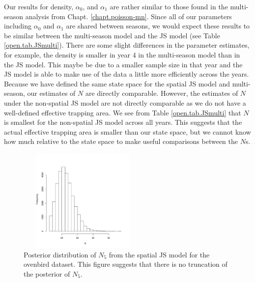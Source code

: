 Our results for density, $\alpha_0$, and $\alpha_1$ are rather similar to
those found in the multi-season analysis from
Chapt. \ref{chapt.poisson-mn}.  Since all of our parameters including
$\alpha_0$ and $\alpha_1$ are shared between seasons, we would expect these
results to be similar between the multi-season model and the JS model
(see Table \ref{open.tab.JSmulti}).  There are some slight differences
in the parameter estimates, for example, the density is smaller in
year 4 in the multi-season model than in the JS model.  This maybe be
due to a smaller sample size in that year and the JS model is able to
make use of the data a little more efficiently across the years.
Because we have defined the same state space for the spatial JS model
and multi-season, our estimates of $N$ are directly comparable.
However, the estimates of $N$ under the non-spatial JS model are not
directly comparable as we do not have a well-defined effective
trapping area.  We see from Table \ref{open.tab.JSmulti} that $N$ is
smallest for the non-spatial JS model across all years.  This suggests
that the actual effective trapping area is smaller than our state
space, but we cannot know how much relative to the state space to make
useful comparisons between the $N$s.


\begin{figure}
\centering
\includegraphics[height=2in,width=2.5in]{Ch16-Open/figs/Nhat5ovenbird.pdf}
\caption{Posterior distribution of $N_5$ from the spatial JS model for
  the ovenbird dataset.  This figure
suggests that there is no truncation of the posterior of $N_5$. }
\label{open.figs.ovenbirdN5hist}
\end{figure}

